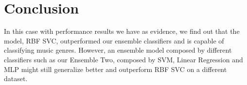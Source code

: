 \section{Conclusion}
In this case with performance results we have as evidence, we find out that the model, RBF SVC, outperformed our ensemble classifiers and is capable of classifying music genres. However, an ensemble model composed by different classifiers such as our Ensemble Two, composed by SVM, Linear Regression and MLP might still generalize better and outperform RBF SVC on a different dataset.